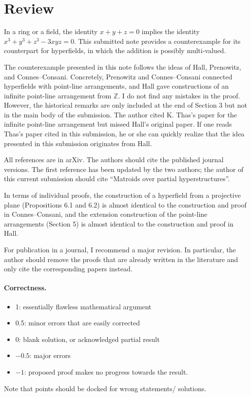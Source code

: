 \documentclass[11pt]{article}
\theoremstyle{remark}
\begin{document}
\maketitle

\section{Review}

In a ring or a field, the identity $x+y+z = 0$ implies the identity $x^3 + y^3 + z^3 - 3xyz = 0$. This submitted note provides a counterexample for its counterpart for hyperfields, in which the addition is possibly multi-valued. 

The counterexample presented in this note follows the ideas of Hall, Prenowitz, and Connes--Consani. Concretely, Prenowitz and Connes--Consani connected hyperfields with point-line arrangements, and Hall gave constructions of an infinite point-line arrangement from $\mathbb{Z}$. I do not find any mistakes in the proof. However, the historical remarks are only included at the end of Section 3 but not in the main body of the submission. The author cited K. Thas's paper for the infinite point-line arrangement but missed Hall's original paper. If one reads Thas's paper cited in this submission, he or she can quickly realize that the idea presented in this submission originates from Hall. 

All references are in arXiv. The authors should cite the published journal versions. The first reference has been updated by the two authors; the author of this current submission should cite ``Matroids over partial hyperstructures''. 

In terms of individual proofs, the construction of a hyperfield from a projective plane (Propositions 6.1 and 6.2) is almost identical to the construction and proof in Connes--Consani, and the extension construction of the point-line arrangements (Section 5) is almost identical to the construction and proof in Hall. 

For publication in a journal, I recommend a major revision. In particular, the author should remove the proofs that are already written in the literature and only cite the corresponding papers instead. 


\paragraph{Correctness.}
\begin{itemize}
	\item  1: essentially flawless mathematical argument
	\item  0.5: minor errors that are easily corrected
	\item  0: blank solution, or acknowledged partial result
	\item  $-0.5$: major errors
	\item  $-1$: proposed proof makes no progress towards the result.
\end{itemize}
Note that points should be docked for wrong statements/ solutions.
\end{document}
